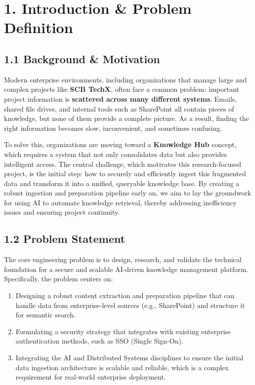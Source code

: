 \documentclass[12pt]{article}
\begin{document}
\tableofcontents
\newpage

\section{1. Introduction \& Problem Definition}

\subsection{1.1 Background \& Motivation}
Modern enterprise environments, including organizations that manage large and complex projects like \textbf{SCB TechX}, often face a common problem: important project information is \textbf{scattered across many different systems}. Emails, shared file drives, and internal tools such as SharePoint all contain pieces of knowledge, but none of them provide a complete picture. As a result, finding the right information becomes slow, inconvenient, and sometimes confusing.

To solve this, organizations are moving toward a \textbf{Knowledge Hub} concept, which requires a system that not only consolidates data but also provides intelligent access. The central challenge, which motivates this research-focused project, is the initial step: how to securely and efficiently ingest this fragmented data and transform it into a unified, queryable knowledge base. By creating a robust ingestion and preparation pipeline early on, we aim to lay the groundwork for using AI to automate knowledge retrieval, thereby addressing inefficiency issues and ensuring project continuity.

\subsection{1.2 Problem Statement}
The core engineering problem is to design, research, and validate the technical foundation for a secure and scalable AI-driven knowledge management platform. Specifically, the problem centers on:
\begin{enumerate}
    \item Designing a robust content extraction and preparation pipeline that can handle data from enterprise-level sources (e.g., SharePoint) and structure it for semantic search.
    \item Formulating a security strategy that integrates with existing enterprise authentication methods, such as SSO (Single Sign-On).
    \item Integrating the AI and Distributed Systems disciplines to ensure the initial data ingestion architecture is scalable and reliable, which is a complex requirement for real-world enterprise deployment.
\end{enumerate}
\end{document}
